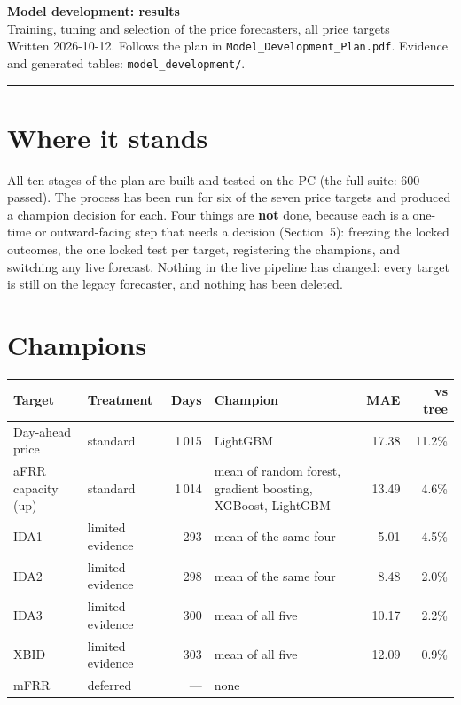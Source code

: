 \documentclass[11pt,a4paper]{article}
\begin{document}
{\LARGE\bfseries\color{accent} Model development: results}\\[4pt]
{\large Training, tuning and selection of the price forecasters, all price targets}\\[2pt]
{\small Written 2026-10-12. Follows the plan in \texttt{Model\_Development\_Plan.pdf}. Evidence and generated tables:
\texttt{model\_development/}.}

\medskip
\hrule

\section{Where it stands}

All ten stages of the plan are built and tested on the PC (the full suite: 600 passed). The process has been run for six of the
seven price targets and produced a champion decision for each. Four things are \textbf{not} done, because each is a one-time or
outward-facing step that needs a decision (Section~5): freezing the locked outcomes, the one locked test per target,
registering the champions, and switching any live forecast. Nothing in the live pipeline has changed: every target is still on
the legacy forecaster, and nothing has been deleted.

\section{Champions}

\begin{center}
\small
\begin{tabular}{@{}p{2.6cm}p{2.5cm}rp{4.4cm}rr@{}}
\toprule
Target & Treatment & Days & Champion & MAE & vs tree \\
\midrule
Day-ahead price & standard & 1\,015 & LightGBM & 17.38 & 11.2\% \\
aFRR capacity (up) & standard & 1\,014 & mean of random forest, gradient boosting, XGBoost, LightGBM & 13.49 & 4.6\% \\
IDA1 & limited evidence & 293 & mean of the same four & 5.01 & 4.5\% \\
IDA2 & limited evidence & 298 & mean of the same four & 8.48 & 2.0\% \\
IDA3 & limited evidence & 300 & mean of all five & 10.17 & 2.2\% \\
XBID & limited evidence & 303 & mean of all five & 12.09 & 0.9\% \\
mFRR & deferred & --- & none & & \\
\bottomrule
\end{tabular}
\end{center}
\end{document}
